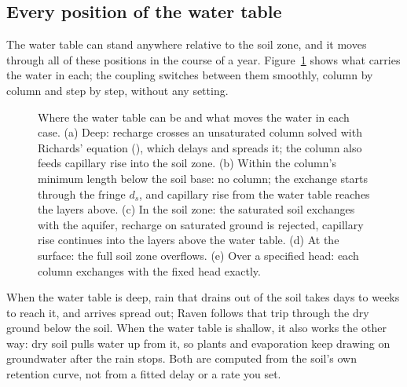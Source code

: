 \subsection{Every position of the water table}\label{sec:szregimes}
The water table can stand anywhere relative to the soil zone, and it moves through all of these positions in the
course of a year. Figure~\ref{fig:szregimes} shows what carries the water in each; the coupling switches between them
smoothly, column by column and step by step, without any setting.
\begin{figure}[!htbp]\centering
\caption{Where the water table can be and what moves the water in each case. (a) Deep: recharge crosses an unsaturated
column solved with Richards' equation (), which delays and spreads it; the column also
feeds capillary rise into the soil zone. (b) Within the column's minimum length below the soil base: no column; the
exchange starts through the fringe $d_s$, and capillary rise from the water table reaches the layers above. (c) In the
soil zone: the saturated soil exchanges with the aquifer, recharge on saturated ground is rejected, capillary rise
continues into the layers above the water table. (d) At the surface: the full soil zone overflows. (e) Over a specified
head: each column exchanges with the fixed head exactly.}\label{fig:szregimes}
\end{figure}

\begin{plain}
When the water table is deep, rain that drains out of the soil takes days to weeks to reach it, and arrives spread
out; Raven follows that trip through the dry ground below the soil. When the water table is shallow, it also
works the other way: dry soil pulls water up from it, so plants and evaporation keep drawing on groundwater after the
rain stops. Both are computed from the soil's own retention curve, not from a fitted delay or a rate you set.
\end{plain}

